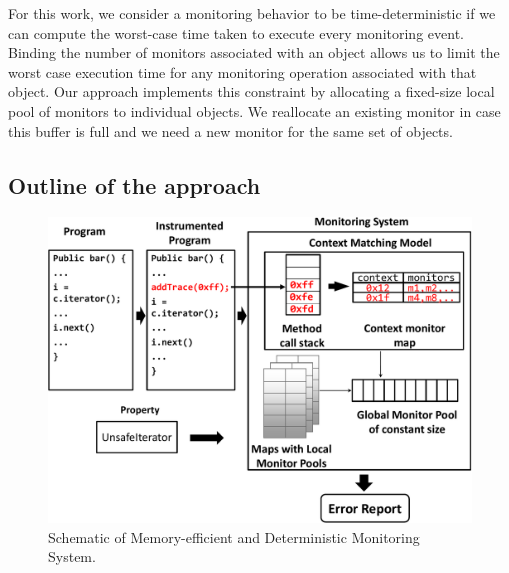 For this work, we consider a monitoring behavior to be time-deterministic if we 
can compute the 
worst-case time taken to execute every monitoring event. Binding the number of 
monitors associated with an object allows us to limit the worst case execution 
time for any monitoring operation associated with that object. Our approach 
implements this constraint by allocating a fixed-size local pool of monitors to 
individual objects. We reallocate an existing monitor in case this buffer is full and we need a new
monitor for the same set of objects.


\subsection{Outline of the approach}
\label{subsec:outline}

\begin{figure}[t]
\centering
  \includegraphics[width=\linewidth]{./images/schematic.pdf}
  \caption[Schematic of Memory-efficient and Deterministic Monitoring 
System]{Schematic of Memory-efficient and Deterministic Monitoring System.}
  \label{fig:schematic}
\end{figure}

